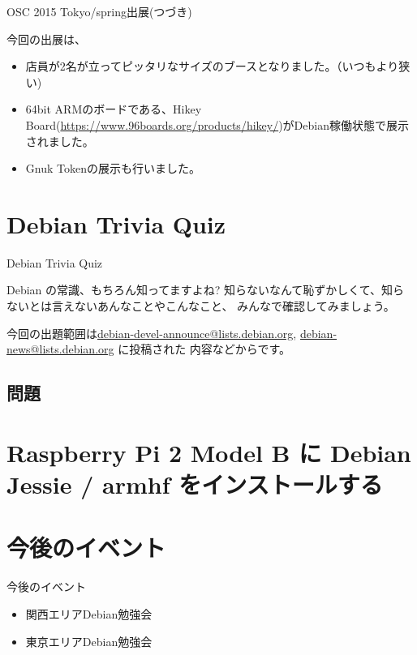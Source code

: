 \begin{frame}{OSC 2015 Tokyo/spring出展(つづき)}

  今回の出展は、
  
  \begin{itemize}
  \item 店員が2名が立ってピッタリなサイズのブースとなりました。（いつもより狭い)
  \item 64bit ARMのボードである、Hikey Board(\url{https://www.96boards.org/products/hikey/})がDebian稼働状態で展示されました。
　\item Gnuk Tokenの展示も行いました。
  \end{itemize}
  
\end{frame}

\section{Debian Trivia Quiz}
\begin{frame}{Debian Trivia Quiz}

  Debian の常識、もちろん知ってますよね?
知らないなんて恥ずかしくて、知らないとは言えないあんなことやこんなこと、
みんなで確認してみましょう。

今回の出題範囲は\url{debian-devel-announce@lists.debian.org},
\url{debian-news@lists.debian.org} に投稿された
内容などからです。

\end{frame}

\subsection{問題}



\section{Raspberry Pi 2 Model B に Debian Jessie / armhf をインストールする}

\section{今後のイベント}
\begin{frame}{今後のイベント}
\begin{itemize}
 \item 関西エリアDebian勉強会
 \item 東京エリアDebian勉強会　
\end{itemize}
\end{frame}

